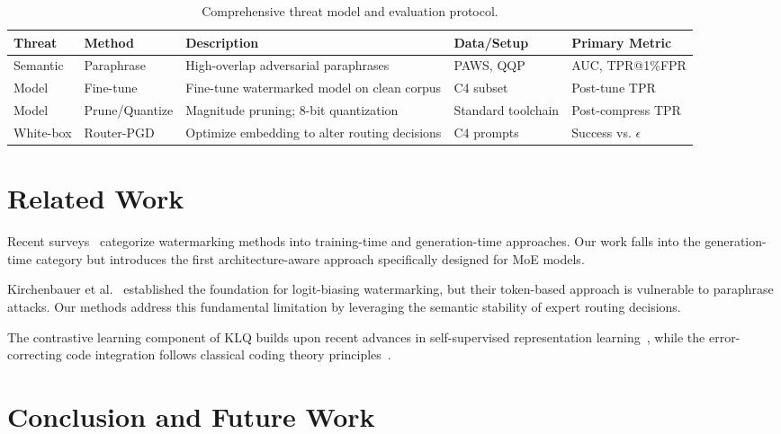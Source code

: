 \begin{table*}[t]
\centering
\small
\begin{tabular}{|l|l|p{4.5cm}|l|l|}
\hline
\textbf{Threat} & \textbf{Method} & \textbf{Description} & \textbf{Data/Setup} & \textbf{Primary Metric} \\
\hline
Semantic & Paraphrase & High-overlap adversarial paraphrases & PAWS, QQP & AUC, TPR@1\%FPR \\
Model & Fine-tune & Fine-tune watermarked model on clean corpus & C4 subset & Post-tune TPR \\
Model & Prune/Quantize & Magnitude pruning; 8-bit quantization & Standard toolchain & Post-compress TPR \\
White-box & Router-PGD & Optimize embedding to alter routing decisions & C4 prompts & Success vs. $\epsilon$ \\
\hline
\end{tabular}
\caption{Comprehensive threat model and evaluation protocol.}
\label{tab:threats}
\end{table*}

\section{Related Work}

Recent surveys~\cite{christ2023watermarking,li2023survey} categorize watermarking methods into training-time and generation-time approaches. Our work falls into the generation-time category but introduces the first architecture-aware approach specifically designed for MoE models.

Kirchenbauer et al.~\cite{kirchenbauer2023watermark} established the foundation for logit-biasing watermarking, but their token-based approach is vulnerable to paraphrase attacks. Our methods address this fundamental limitation by leveraging the semantic stability of expert routing decisions.

The contrastive learning component of KLQ builds upon recent advances in self-supervised representation learning~\cite{chen2020simple}, while the error-correcting code integration follows classical coding theory principles~\cite{macwilliams1977theory}.

\section{Conclusion and Future Work}


